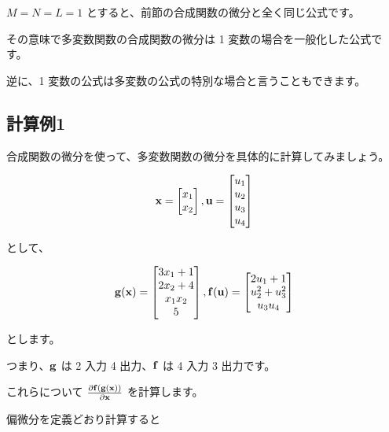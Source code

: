 $M = N = L = 1$ とすると、前節の合成関数の微分と全く同じ公式です。

その意味で多変数関数の合成関数の微分は 1 変数の場合を一般化した公式です。

逆に、1 変数の公式は多変数の公式の特別な場合と言うこともできます。



\subsection{計算例1}


合成関数の微分を使って、多変数関数の微分を具体的に計算してみましょう。


\[
{\bf x} = \begin{bmatrix} x_1 \\ x_2 \end{bmatrix},
{\bf u} = \begin{bmatrix} u_1 \\ u_2 \\ u_3 \\ u_4 \end{bmatrix}
\]


として、


\[
{\bf g}({\bf x}) =
\begin{bmatrix}
3x_1 + 1 \\
2x_2 + 4 \\
x_1 x_2 \\
5
\end{bmatrix},
{\bf f}({\bf u}) =
\begin{bmatrix}
2 u_1 + 1 \\
u_2^2 + u_3^2 \\
u_3 u_4
\end{bmatrix}
\]


とします。

つまり、${\bf g}$ は 2 入力 4 出力、${\bf f}$ は 4 入力 3 出力です。


これらについて $\frac{\partial {\bf f}({\bf g}({\bf x}))}{\partial {\bf x}}$ を計算します。

偏微分を定義どおり計算すると


